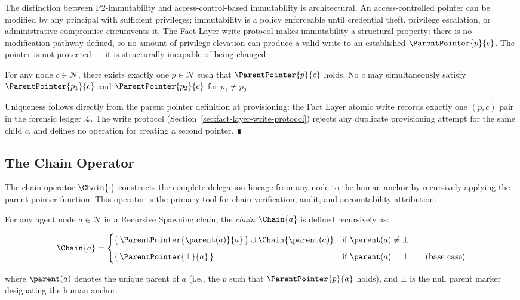 The distinction between P2-immutability and access-control-based immutability is architectural. An access-controlled pointer can be modified by any principal with sufficient privileges; immutability is a policy enforceable until credential theft, privilege escalation, or administrative compromise circumvents it. The Fact Layer write protocol makes immutability a structural property: there is no modification pathway defined, so no amount of privilege elevation can produce a valid write to an established $\ParentPointer{p}{c}$. The pointer is not protected --- it is structurally incapable of being changed.

\begin{prop}
\label{prop:singleton-parent}
For any node $c \in \mathcal{N}$, there exists exactly one $p \in \mathcal{N}$ such that $\ParentPointer{p}{c}$ holds. No $c$ may simultaneously satisfy $\ParentPointer{p_1}{c}$ and $\ParentPointer{p_2}{c}$ for $p_1 \neq p_2$.
\end{prop}
\begin{pf}
Uniqueness follows directly from the parent pointer definition at provisioning: the Fact Layer atomic write records exactly one $(p, c)$ pair in the forensic ledger $\mathcal{L}$. The write protocol (Section~\ref{sec:fact-layer-write-protocol}) rejects any duplicate provisioning attempt for the same child $c$, and defines no operation for creating a second pointer. ∎
\end{pf}

\subsection{The Chain Operator}
\label{sec:chain-operator}

The chain operator $\Chain{\cdot}$ constructs the complete delegation lineage from any node to the human anchor by recursively applying the parent pointer function. This operator is the primary tool for chain verification, audit, and accountability attribution.

\begin{dfn}
\label{def:chain-operator}
For any agent node $a \in \mathcal{N}$ in a Recursive Spawning chain, the \emph{chain} $\Chain{a}$ is defined recursively as:

\begin{equation}
\Chain{a} =
\begin{cases}
\{\, \ParentPointer{\parent(a)}{a} \,\} \cup \Chain{\parent(a)} & \text{if } \parent(a) \neq \bot \\[6pt]
\{\, \ParentPointer{\bot}{a} \,\} & \text{if } \parent(a) = \bot \tag{base case}
\end{cases}
\end{equation}

\noindent where $\parent(a)$ denotes the unique parent of $a$ (i.e., the $p$ such that $\ParentPointer{p}{a}$ holds), and $\bot$ is the null parent marker designating the human anchor.
\end{dfn}

